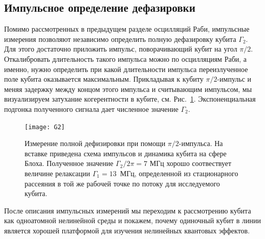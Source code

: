 \subsection{Импульсное определение дефазировки}
Помимо рассмотренных в предыдущем разделе осцилляций Раби, импульсные измерения позволяют независимо определить полную дефазировку кубита $\Gamma_2$. Для этого достаточно приложить импульс, поворачивающий кубит на угол $\pi/2$. Откалибровать длительность такого импульса можно по осцилляциям Раби, а именно, нужно определить при какой длительности импульса переизлученное поле кубита оказывается максимальным. Прикладывая к кубиту $\pi/2$-импульс и меняя задержку между концом этого импульса и считывающим импульсом, мы визуализируем затухание когерентности в кубите, см. Рис.~\ref{fig: G2}. Экспоненциальная подгонка полученного сигнала дает численное значение $\Gamma_2$. 

\begin{figure}[h]
\centering
\texttt{[image: G2]}
\caption[Измерение полной дефизировки при помощи $\pi/2$-импульса.]{Измерение полной дефизировки при помощи $\pi/2$-импульса. На вставке приведена схема импульсов и динамика кубита на сфере Блоха. Полученное значение $\Gamma_2/2\pi=7$ МГц хорошо соотвествует величине релаксации $\Gamma_1=13$~МГц, определенной из стационарного рассеяния в той же рабочей точке по потоку для исследуемого кубита.}
\label{fig: G2}
\end{figure}

После описания импульсных измерений мы переходим к рассмотрению кубита как одноатомной нелинейной среды и покажем, почему одиночный кубит в линии является хорошей платформой для изучения нелинейных квантовых эффектов.
